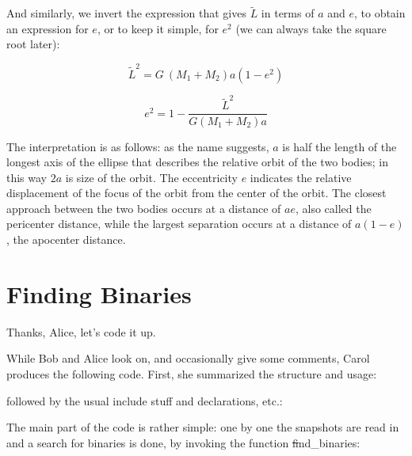 \abc

\alice
And similarly, we invert the expression that gives $\tilde L$ in terms
of $a$ and $e$, to obtain an expression for $e$, or to keep it simple,
for $e^2$ (we can always take the square root later):

\cba

\begin{equation}
\tilde L^2 = G\: (M_1 + M_2)a(1-e^2)
\end{equation}

\begin{equation}
e^2 = 1 - \frac{\tilde L^2}{G(M_1 + M_2)a}\label{eq:e}
\end{equation}

\abc

\alice
The interpretation is as follows: as the name suggests, $a$ is half
the length of the longest axis of the ellipse that describes the
relative orbit of the two bodies; in this way $2a$ is size of the orbit.
The eccentricity $e$ indicates the relative displacement of the focus
of the orbit from the center of the orbit.  The closest approach
between the two bodies occurs at a distance of $ae$, also called the
pericenter distance, while the largest separation occurs at a distance
of $a(1-e)$, the apocenter distance.

\cba

\section{Finding Binaries}

\abc

\carol
Thanks, Alice, let's code it up.

\cba

While Bob and Alice look on, and occasionally give some comments,
Carol produces the following code.  First, she summarized the
structure and usage:


followed by the usual include stuff and declarations, etc.:


The main part of the code is rather simple: one by one the snapshots
are read in and a search for binaries is done, by invoking the
function {\st find\_binaries}:


